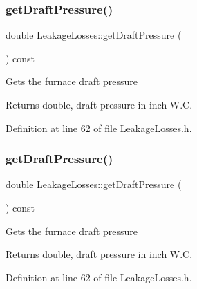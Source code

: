 \mbox{\label{class_leakage_losses_a0ec89fc6371c4a788e1bb861c7cfba35}} 
\subsubsection{\texorpdfstring{get\+Draft\+Pressure()}{getDraftPressure()}\hspace{0.1cm}{\footnotesize\ttfamily [1/3]}}
{\footnotesize\ttfamily double Leakage\+Losses\+::get\+Draft\+Pressure (\begin{DoxyParamCaption}{ }\end{DoxyParamCaption}) const\hspace{0.3cm}{\ttfamily [inline]}}

Gets the furnace draft pressure

\begin{DoxyReturn}{Returns}
double, draft pressure in inch W.\+C. 
\end{DoxyReturn}


Definition at line 62 of file Leakage\+Losses.\+h.

\mbox{\label{class_leakage_losses_a0ec89fc6371c4a788e1bb861c7cfba35}} 
\subsubsection{\texorpdfstring{get\+Draft\+Pressure()}{getDraftPressure()}\hspace{0.1cm}{\footnotesize\ttfamily [2/3]}}
{\footnotesize\ttfamily double Leakage\+Losses\+::get\+Draft\+Pressure (\begin{DoxyParamCaption}{ }\end{DoxyParamCaption}) const\hspace{0.3cm}{\ttfamily [inline]}}

Gets the furnace draft pressure

\begin{DoxyReturn}{Returns}
double, draft pressure in inch W.\+C. 
\end{DoxyReturn}


Definition at line 62 of file Leakage\+Losses.\+h.

